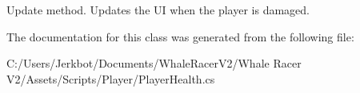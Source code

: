 Update method. Updates the UI when the player is damaged. 



The documentation for this class was generated from the following file\+:\begin{DoxyCompactItemize}
\item 
C\+:/\+Users/\+Jerkbot/\+Documents/\+Whale\+Racer\+V2/\+Whale Racer V2/\+Assets/\+Scripts/\+Player/Player\+Health.\+cs\end{DoxyCompactItemize}
